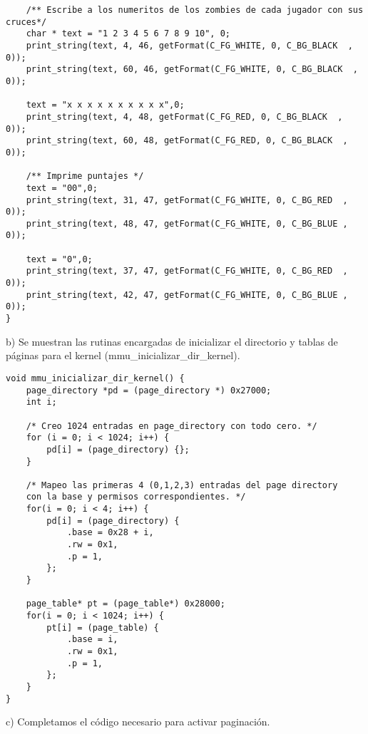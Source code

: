 \documentclass[a4paper]{article}
\begin{document}
\begin{codesnippet}
\begin{verbatim}
    /** Escribe a los numeritos de los zombies de cada jugador con sus cruces*/
    char * text = "1 2 3 4 5 6 7 8 9 10", 0;
    print_string(text, 4, 46, getFormat(C_FG_WHITE, 0, C_BG_BLACK  , 0));
    print_string(text, 60, 46, getFormat(C_FG_WHITE, 0, C_BG_BLACK  , 0));

    text = "x x x x x x x x x x",0;
    print_string(text, 4, 48, getFormat(C_FG_RED, 0, C_BG_BLACK  , 0));
    print_string(text, 60, 48, getFormat(C_FG_RED, 0, C_BG_BLACK  , 0));

    /** Imprime puntajes */
    text = "00",0;
    print_string(text, 31, 47, getFormat(C_FG_WHITE, 0, C_BG_RED  , 0));
    print_string(text, 48, 47, getFormat(C_FG_WHITE, 0, C_BG_BLUE , 0));

    text = "0",0;
    print_string(text, 37, 47, getFormat(C_FG_WHITE, 0, C_BG_RED  , 0));
    print_string(text, 42, 47, getFormat(C_FG_WHITE, 0, C_BG_BLUE , 0));
}
\end{verbatim}
\end{codesnippet}

{\large b)} Se muestran las rutinas encargadas de inicializar el directorio y tablas de p\'aginas para el kernel
(mmu_inicializar_dir_kernel). 

\begin{codesnippet}
\begin{verbatim}
void mmu_inicializar_dir_kernel() {
    page_directory *pd = (page_directory *) 0x27000;
    int i;

    /* Creo 1024 entradas en page_directory con todo cero. */
    for (i = 0; i < 1024; i++) {
        pd[i] = (page_directory) {};
    }

    /* Mapeo las primeras 4 (0,1,2,3) entradas del page directory
    con la base y permisos correspondientes. */
    for(i = 0; i < 4; i++) {
        pd[i] = (page_directory) {
            .base = 0x28 + i,
            .rw = 0x1,
            .p = 1,
        };
    }

    page_table* pt = (page_table*) 0x28000;
    for(i = 0; i < 1024; i++) {
        pt[i] = (page_table) {
            .base = i,
            .rw = 0x1,
            .p = 1,
        };
    }
}
\end{verbatim}
\end{codesnippet}



{\large c)} Completamos el c\'odigo necesario para activar paginaci\'on.\\
\end{document}
